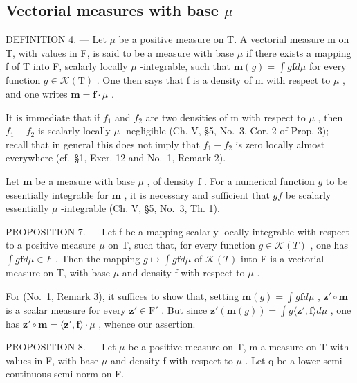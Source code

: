 \subsection{\texorpdfstring{Vectorial measures with base \(\mu\)}{Vectorial measures with base mu}}

DEFINITION 4. --- Let \(\mu\) be a positive measure on T. A vectorial measure m on T, with values in F, is said to be a measure with base \(\mu\) if there exists a mapping f of T into F, scalarly locally \(\mu\) -integrable, such that \(\mathbf{m}(g) = \int g\mathbf{f}d\mu\) for every function \(g \in \mathcal{K}(\mathrm{T})\) . One then says that f is a density of m with respect to \(\mu\) , and one writes \(\mathbf{m} = \mathbf{f} \cdot \mu\) .

It is immediate that if \(f_{1}\) and \(f_{2}\) are two densities of m with respect to \(\mu\) , then \(f_{1}-f_{2}\) is scalarly locally \(\mu\) -negligible (Ch. V, §5, No.~3, Cor. 2 of Prop. 3); recall that in general this does not imply that \(f_{1}-f_{2}\) is zero locally almost everywhere (cf.~§1, Exer. 12 and No.~1, Remark 2).

Let \(\mathbf{m}\) be a measure with base \(\mu\) , of density \(\mathbf{f}\) . For a numerical function \(g\) to be essentially integrable for \(\mathbf{m}\) , it is necessary and sufficient that \(gf\) be scalarly essentially \(\mu\) -integrable (Ch. V, §5, No.~3, Th. 1).

PROPOSITION 7. --- Let f be a mapping scalarly locally integrable with respect to a positive measure \(\mu\) on T, such that, for every function \(g \in \mathcal{K}(T)\) , one has \(\int g\mathbf{f} d\mu \in F\) . Then the mapping \(g \mapsto \int g\mathbf{f} d\mu\) of \(\mathcal{K}(T)\) into F is a vectorial measure on T, with base \(\mu\) and density f with respect to \(\mu\) .

For (No.~1, Remark 3), it suffices to show that, setting \(\mathbf{m}(g) = \int g\mathbf{f}d\mu\) , \(\mathbf{z}' \circ \mathbf{m}\) is a scalar measure for every \(\mathbf{z}' \in \mathrm{F}'\) . But since \(\mathbf{z}'(\mathbf{m}(g)) = \int g\langle \mathbf{z}', \mathbf{f} \rangle d\mu\) , one has \(\mathbf{z}' \circ \mathbf{m} = \langle \mathbf{z}', \mathbf{f} \rangle \cdot \mu\) , whence our assertion.

PROPOSITION 8. --- Let \(\mu\) be a positive measure on T, m a measure on T with values in F, with base \(\mu\) and density f with respect to \(\mu\) . Let q be a lower semi-continuous semi-norm on F.

